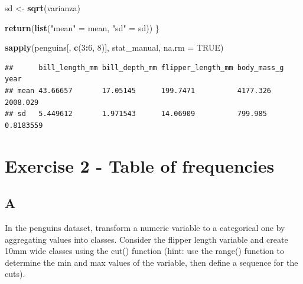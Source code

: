 \documentclass[
]{article}
\newenvironment{Shaded}{\begin{snugshade}}{\end{snugshade}}
\newcommand{\AttributeTok}[1]{\textcolor[rgb]{0.13,0.29,0.53}{#1}}
\newcommand{\ConstantTok}[1]{\textcolor[rgb]{0.56,0.35,0.01}{#1}}
\newcommand{\DecValTok}[1]{\textcolor[rgb]{0.00,0.00,0.81}{#1}}
\newcommand{\FunctionTok}[1]{\textcolor[rgb]{0.13,0.29,0.53}{\textbf{#1}}}
\newcommand{\NormalTok}[1]{#1}
\newcommand{\OtherTok}[1]{\textcolor[rgb]{0.56,0.35,0.01}{#1}}
\newcommand{\SpecialCharTok}[1]{\textcolor[rgb]{0.81,0.36,0.00}{\textbf{#1}}}
\newcommand{\StringTok}[1]{\textcolor[rgb]{0.31,0.60,0.02}{#1}}
\begin{document}
\begin{Shaded}
\begin{Highlighting}[]
\NormalTok{  sd }\OtherTok{\textless{}{-}} \FunctionTok{sqrt}\NormalTok{(varianza)}

  \FunctionTok{return}\NormalTok{(}\FunctionTok{list}\NormalTok{(}\StringTok{"mean"} \OtherTok{=}\NormalTok{ mean, }\StringTok{"sd"} \OtherTok{=}\NormalTok{ sd))}
\NormalTok{\}}

\FunctionTok{sapply}\NormalTok{(penguins[, }\FunctionTok{c}\NormalTok{(}\DecValTok{3}\SpecialCharTok{:}\DecValTok{6}\NormalTok{, }\DecValTok{8}\NormalTok{)], stat\_manual, }\AttributeTok{na.rm =} \ConstantTok{TRUE}\NormalTok{)}
\end{Highlighting}
\end{Shaded}

\begin{verbatim}
##      bill_length_mm bill_depth_mm flipper_length_mm body_mass_g year     
## mean 43.66657       17.05145      199.7471          4177.326    2008.029 
## sd   5.449612       1.971543      14.06909          799.985     0.8183559
\end{verbatim}

\hypertarget{exercise-2---table-of-frequencies}{%
\section{Exercise 2 - Table of
frequencies}\label{exercise-2---table-of-frequencies}}

\hypertarget{a-1}{%
\subsection{A}\label{a-1}}

In the penguins dataset, transform a numeric variable to a categorical
one by aggregating values into classes. Consider the flipper length
variable and create 10mm wide classes using the cut() function (hint:
use the range() function to determine the min and max values of the
variable, then define a sequence for the cuts).

\begin{Shaded}
\end{Shaded}
\end{document}
